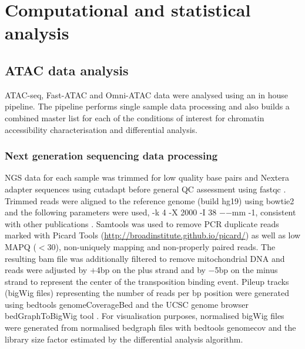 \section{Computational and statistical analysis}

\subsection{ATAC data analysis}
\label{ATAC_analysis}
ATAC-seq, Fast-ATAC and Omni-ATAC data were analysed using an in house pipeline. The pipeline performs single sample data processing and also builds a combined master list for each of the conditions of interest for chromatin accessibility characterisation and differential analysis. 

\subsubsection{Next generation sequencing data processing}
NGS data for each sample was trimmed for low quality base pairs and Nextera adapter sequences using cutadapt \parencite{Martin2011} before general QC assessment using fastqc \parencite{Andrews2010}. Trimmed reads were aligned to the reference genome (build hg19) using bowtie2 \parencite{Langmead2012} and the following parameters were used, -k 4 -X 2000 -I 38 $-$$-$mm -1, consistent with other publications \parencite{Buenrostro2013, Corces2016}. Samtools \parencite{Li2009} was used to remove PCR duplicate reads marked with Picard Tools (\url{http://broadinstitute.github.io/picard/}) as well as low MAPQ (${<}$30), non-uniquely mapping and non-properly paired reads. The resulting bam file was additionally filtered to remove mitochondrial DNA and reads were adjusted by $+$4bp on the plus strand and by $-$5bp on the minus strand to represent the center of the transposition binding event. Pileup tracks (bigWig files) representing the number of reads per bp position were generated using bedtools genomeCoverageBed \parencite{Quinlan2010} and the UCSC genome browser bedGraphToBigWig tool \parencite{Kent2010}. For visualisation purposes, normalised bigWig files were generated from normalised bedgraph files with bedtools genomecov and the library size factor estimated by the differential analysis algorithm. 

